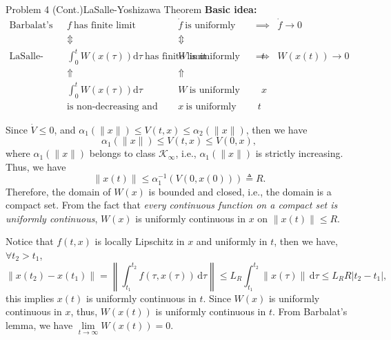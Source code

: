 \documentclass[8pt]{beamer}
\begin{document}
\begin{frame}[t]{Problem 4 (Cont.)}{LaSalle-Yoshizawa Theorem}
  \textbf{Basic idea:}
    {\footnotesize\[\begin{matrix}
      \text{Barbalat's lemma}&f\ \text{has finite limit} & \dot{f}\ \text{is uniformly continuous} & \implies & \dot{f}\to 0\\
      &\Updownarrow & \Updownarrow & &\\
      \text{LaSalle-Yoshizawa Theorem}&\int^t_0  W (x (\tau)) \mathrm{d} \tau\ \text{has finite limit} & W\ \text{is uniformly continuous w.r.t.}\ t & \implies & W(x(t))\to 0\\
      &\Uparrow &\Uparrow && \\
      & \int^t_0  W (x (\tau)) \mathrm{d} \tau\ & W\ \text{is uniformly continuous w.r.t.}\ x&&\\
      &\text{is non-decreasing and upper bounded}&x\ \text{is uniformly continuous w.r.t.}\ t &&
    \end{matrix}\]}
  
     Since $\dot V \le 0$, and $\alpha_1(\|x\|) \le V(t,x) \le \alpha_2(\|x\|)$, then we have 
  \begin{equation*}
      \alpha_1(\|x\|) \le V(t,x) \le V(0,x),
  \end{equation*}
  where $\alpha_1(\|x\|)$ belongs to class $\mathcal{K}_\infty$, i.e., $\alpha_1(\|x\|)$ is strictly increasing. Thus, we have
  \begin{equation*}
      \|x(t)\| \le \alpha_1^{-1}(V(0,x(0))) \triangleq R.
  \end{equation*}
   Therefore, the domain of $W(x)$ is bounded and closed, i.e., the domain is a compact set. From the fact that \textit{every continuous function on a compact set is uniformly continuous}, $W(x)$ is uniformly continuous in $x$ on $\|x(t)\| \le R$.

   Notice that $f(t,x)$ is locally Lipschitz in $x$ and uniformly in $t$, then we have, $\forall t_2 > t_1$,
   \begin{equation*}
       \|x(t_2) - x(t_1)\| = \left\| \int_{t_1}^{t_2} f(\tau, x(\tau)) \, \mathrm{d}\tau \right\| \leq L_R \int_{t_1}^{t_2} \| x(\tau) \| \, \mathrm{d}\tau \leq L_R R |t_2 - t_1|,
   \end{equation*}
   this implies $x(t)$ is uniformly continuous in $t$. Since $W(x)$ is uniformly continuous in $x$, thus, $W(x(t))$ is uniformly continuous in $t$.
   From Barbalat's lemma, we have $\lim\limits_{t \to \infty}W(x(t))=0$.

\end{frame}
\end{document}
